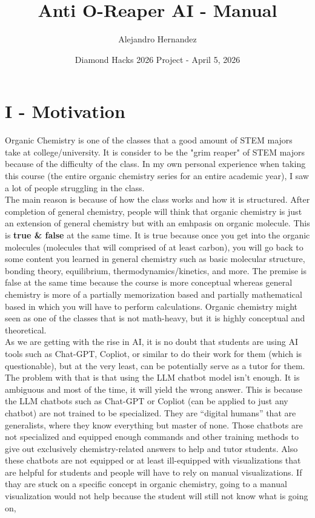 \documentclass{article}
\title{\textbf{Anti O-Reaper AI - Manual}}
\author{Alejandro Hernandez}
\date{Diamond Hacks 2026 Project - April 5, 2026}
\begin{document}
\maketitle

\section*{I - Motivation}
Organic Chemistry is one of the classes that a good amount of STEM majors take at college/university. It is consider to be the "grim reaper" of STEM majors because of the difficulty of the class. In my own personal experience when taking this course (the entire organic chemistry series for an entire academic year), I saw a lot of people struggling in the class.
\\[2em]
The main reason is because of how the class works and how it is structured. After completion of general chemistry, people will think that organic chemistry is just an extension of general chemistry but with an emhpasis on organic molecule. This is
\textbf{true \& false}
at the same time. It is true because once you get into the organic molecules (molecules that will comprised of at least carbon), you will go back to some content you learned in general chemistry such as basic molecular structure, bonding theory, equilibrium, thermodynamics/kinetics, and more.
The premise is false at the same time because the course is more conceptual whereas general chemistry is more of a partially memorization based and partially mathematical based in which you
will have to perform calculations. Organic chemistry might seen as one of the classes that is not math-heavy, but it is highly conceptual and theoretical.
\\[2em]
As we are getting with the rise in AI, it is no doubt that students are using AI tools such as Chat-GPT, Copliot, or similar to do their work for them (which is questionable), but at the very least, can be potentially serve as a tutor for them.
The problem with that is that using the LLM chatbot model isn't enough. It is ambiguous and most of the time, it will yield the wrong answer. This is because the LLM chatbots such as Chat-GPT or Copliot (can be applied to just any chatbot) are not trained to be specialized.
They are ``digital humans'' that are generalists, where they know everything but master of none. Those chatbots are not specialized and equipped enough commands and other training methods to give out exclusively chemistry-related answers to help and tutor students. Also these chatbots
are not equipped or at least ill-equipped with visualizations that are helpful for students and people will have to rely on manual visualizations. If thay are stuck on a specific concept in organic chemistry, going to a manual visualization would not help because the student will still not know what is going on,
\end{document}

